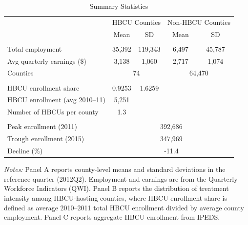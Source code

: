 
\begin{table}[t]
\centering
\caption{Summary Statistics}
\label{tab:summary}
\begin{threeparttable}
\begin{tabular}{lcccc}
\hline\hline
 & \multicolumn{2}{c}{HBCU Counties} & \multicolumn{2}{c}{Non-HBCU Counties} \\
 \cmidrule(lr){2-3} \cmidrule(lr){4-5}
 & Mean & SD & Mean & SD \\
\hline
\addlinespace
\multicolumn{5}{l}{\textit{Panel A: County Characteristics (2012Q2)}} \\
\addlinespace
Total employment & 35,392 & 119,343 & 6,497 & 45,787 \\
Avg quarterly earnings (\$) & 3,138 & 1,060 & 2,717 & 1,074 \\
Counties & \multicolumn{2}{c}{74} & \multicolumn{2}{c}{64,470} \\
\addlinespace
\multicolumn{5}{l}{\textit{Panel B: Treatment Intensity (HBCU Counties Only)}} \\
\addlinespace
HBCU enrollment share & 0.9253 & 1.6259 & & \\
HBCU enrollment (avg 2010--11) & 5,251 & & & \\
Number of HBCUs per county & 1.3 & & & \\
\addlinespace
\multicolumn{5}{l}{\textit{Panel C: HBCU Enrollment Trends}} \\
\addlinespace
Peak enrollment (2011) & \multicolumn{4}{c}{392,686} \\
Trough enrollment (2015) & \multicolumn{4}{c}{347,969} \\
Decline (\%) & \multicolumn{4}{c}{-11.4} \\
\hline\hline
\end{tabular}
\begin{tablenotes}\small
\item \textit{Notes:} Panel A reports county-level means and standard deviations in the reference quarter (2012Q2). Employment and earnings are from the Quarterly Workforce Indicators (QWI). Panel B reports the distribution of treatment intensity among HBCU-hosting counties, where HBCU enrollment share is defined as average 2010--2011 total HBCU enrollment divided by average county employment. Panel C reports aggregate HBCU enrollment from IPEDS.
\end{tablenotes}
\end{threeparttable}
\end{table}
